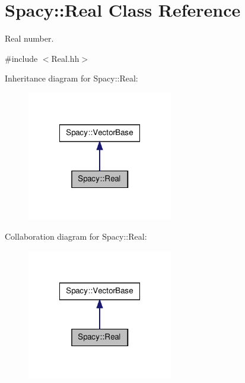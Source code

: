 \hypertarget{classSpacy_1_1Real}{\section{\-Spacy\-:\-:\-Real \-Class \-Reference}
\label{classSpacy_1_1Real}
}


\-Real number.  




{\ttfamily \#include $<$\-Real.\-hh$>$}



\-Inheritance diagram for \-Spacy\-:\-:\-Real\-:
\nopagebreak
\begin{figure}[H]
\begin{center}
\leavevmode
\includegraphics[width=180pt]{classSpacy_1_1Real__inherit__graph}
\end{center}
\end{figure}


\-Collaboration diagram for \-Spacy\-:\-:\-Real\-:
\nopagebreak
\begin{figure}[H]
\begin{center}
\leavevmode
\includegraphics[width=180pt]{classSpacy_1_1Real__coll__graph}
\end{center}
\end{figure}

